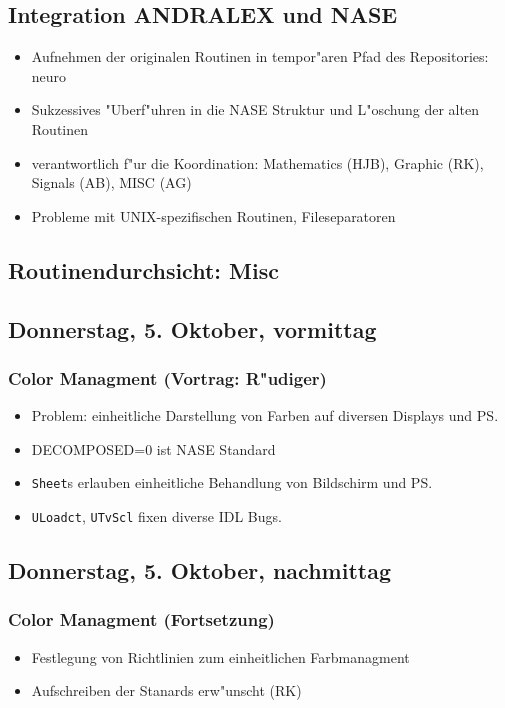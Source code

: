 \documentclass[12pt]{article}
\begin{document}
\subsection{Integration ANDRALEX und NASE}
\begin{itemize}
\item Aufnehmen der originalen Routinen in tempor"aren Pfad des Repositories: neuro
\item Sukzessives "Uberf"uhren in die NASE Struktur und L"oschung der alten Routinen
\item verantwortlich f"ur die Koordination: Mathematics (HJB),  Graphic (RK), Signals (AB), MISC (AG)
\item Probleme mit UNIX-spezifischen Routinen, Fileseparatoren
\end{itemize}

\subsection{Routinendurchsicht: Misc}



\subsection{Donnerstag, 5. Oktober, vormittag}

\subsubsection{Color Managment (Vortrag: R"udiger)}
\begin{itemize}
\item Problem: einheitliche Darstellung von Farben auf diversen Displays und PS.
\item DECOMPOSED=0 ist NASE Standard
\item \texttt{Sheet}s erlauben einheitliche Behandlung von Bildschirm und PS.
\item \texttt{ULoadct}, \texttt{UTvScl} fixen diverse IDL Bugs.
\end{itemize}

\subsection{Donnerstag, 5. Oktober, nachmittag}

\subsubsection{Color Managment (Fortsetzung)}
\begin{itemize}
\item Festlegung von Richtlinien zum einheitlichen Farbmanagment
\item Aufschreiben der Stanards erw"unscht (RK)
\end{itemize}
\end{document}
